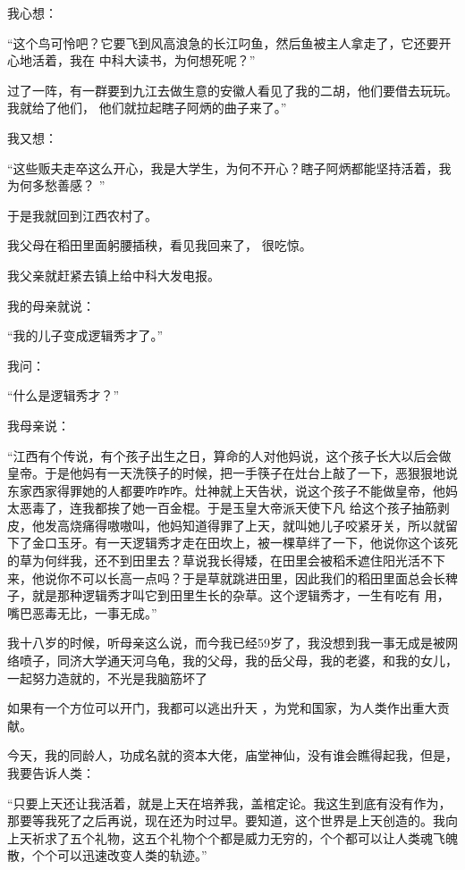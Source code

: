 \documentclass{article}
\begin{document}
我心想： 

“这个鸟可怜吧？它要飞到风高浪急的长江叼鱼，然后鱼被主人拿走了，它还要开心地活着，我在
中科大读书，为何想死呢？” 

过了一阵，有一群要到九江去做生意的安徽人看见了我的二胡，他们要借去玩玩。我就给了他们，
他们就拉起瞎子阿炳的曲子来了。” 


我又想： 

“这些贩夫走卒这么开心，我是大学生，为何不开心？瞎子阿炳都能坚持活着，我为何多愁善感？
” 


于是我就回到江西农村了。 

\newpage

我父母在稻田里面躬腰插秧，看见我回来了，
很吃惊。 


我父亲就赶紧去镇上给中科大发电报。 


我的母亲就说： 


“我的儿子变成逻辑秀才了。” 


我问： 


“什么是逻辑秀才？” 


我母亲说： 

“江西有个传说，有个孩子出生之日，算命的人对他妈说，这个孩子长大以后会做皇帝。于是他妈有一天洗筷子的时候，把一手筷子在灶台上敲了一下，恶狠狠地说东家西家得罪她的人都要咋咋咋。灶神就上天告状，说这个孩子不能做皇帝，他妈太恶毒了，连我都挨了她一百金棍。于是玉皇大帝派天使下凡
\newpage
给这个孩子抽筋剥皮，他发高烧痛得嗷嗷叫，他妈知道得罪了上天，就叫她儿子咬紧牙关，所以就留下了金口玉牙。有一天逻辑秀才走在田坎上，被一棵草绊了一下，他说你这个该死的草为何绊我，还不到田里去？草说我长得矮，在田里会被稻禾遮住阳光活不下来，他说你不可以长高一点吗？于是草就跳进田里，因此我们的稻田里面总会长稗子，就是那种逻辑秀才叫它到田里生长的杂草。这个逻辑秀才，一生有吃有
用，嘴巴恶毒无比，一事无成。” 

我十八岁的时候，听母亲这么说，而今我已经59岁了，我没想到我一事无成是被网络喷子，同济大学通天河乌龟，我的父母，我的岳父母，我的老婆，和我的女儿，一起努力造就的，不光是我脑筋坏了

如果有一个方位可以开门，我都可以逃出升天
，为党和国家，为人类作出重大贡献。 

今天，我的同龄人，功成名就的资本大佬，庙堂神仙，没有谁会瞧得起我，但是，我要告诉人类：

\newpage

“只要上天还让我活着，就是上天在培养我，盖棺定论。我这生到底有没有作为，那要等我死了之后再说，现在还为时过早。要知道，这个世界是上天创造的。我向上天祈求了五个礼物，这五个礼物个个都是威力无穷的，个个都可以让人类魂飞魄散，个个可以迅速改变人类的轨迹。”
\end{document}
